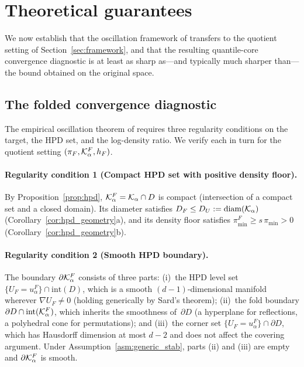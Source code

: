 %  

\section{Theoretical guarantees}
\label{sec:theory}

We now establish that the oscillation framework of \citet{LCNF}
transfers to the quotient setting of
Section~\ref{sec:framework}, and that the resulting
quantile-core convergence diagnostic is at least as sharp
as---and typically much sharper than---the bound obtained on
the original space.


\subsection{The folded convergence diagnostic}
\label{sec:folded_cert}

The empirical oscillation theorem of \citet[Theorem~5.1]{LCNF}
requires three regularity conditions on the target, the HPD set,
and the log-density ratio.  We verify each in turn for the quotient
setting $(\pi_F, \mathcal{K}_\alpha^F, h_F)$.

\paragraph{Regularity condition 1 (Compact HPD set with positive density floor).}
By Proposition~\ref{prop:hpd}, $\mathcal{K}_\alpha^F = \mathcal{K}_\alpha \cap D$ is
compact (intersection of a compact set and a closed domain).
Its diameter satisfies $D_F \leq D_U := \mathrm{diam}(\mathcal{K}_\alpha)$
(Corollary~\ref{cor:hpd_geometry}a), and its density floor satisfies
$\pi_{\min}^F \geq s\,\pi_{\min} > 0$
(Corollary~\ref{cor:hpd_geometry}b).

\paragraph{Regularity condition 2 (Smooth HPD boundary).}
The boundary $\partial\mathcal{K}_\alpha^F$ consists of three parts:
(i)~the HPD level set $\{U_F = u_\alpha^F\} \cap \mathrm{int}(D)$,
which is a smooth $(d{-}1)$-dimensional manifold wherever
$\nabla U_F \neq 0$ (holding generically by Sard's theorem);
(ii)~the fold boundary $\partial D \cap \mathrm{int}(\mathcal{K}_\alpha^F)$,
which inherits the smoothness of~$\partial D$ (a hyperplane for
reflections, a polyhedral cone for permutations); and
(iii)~the corner set $\{U_F = u_\alpha^F\} \cap \partial D$,
which has Hausdorff dimension at most $d{-}2$ and does not affect
the covering argument.
Under Assumption~\ref{asm:generic_stab}, parts (ii) and (iii)
are empty and $\partial\mathcal{K}_\alpha^F$ is smooth.


